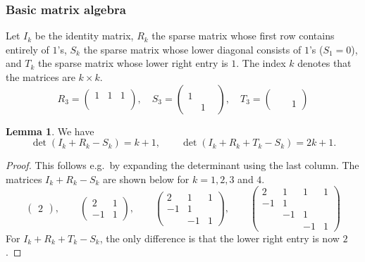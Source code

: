 \documentclass[12pt]{amsart}
\theoremstyle{definition}
\newtheorem{lemma}[theorem]{Lemma}
\numberwithin{equation}{section}
\begin{document}
\subsubsection{Basic matrix algebra}
Let $I_k$ be the identity matrix, $R_{k}$ the sparse matrix whose first row contains entirely of $1$'s, $S_{k}$ the sparse matrix whose lower diagonal consists of $1$'s ($S_1=0$), and $T_k$ the sparse matrix whose lower right entry is $1$. The index $k$ denotes that the matrices are $k\times k$.
\begin{equation}
R_3=\begin{pmatrix}1&1&1\\&&\\&&\end{pmatrix},\quad S_3=\begin{pmatrix}&&\\1&\\&1\end{pmatrix},\quad T_3=\begin{pmatrix}&&\\&&\\&&1\end{pmatrix}
\end{equation}
\begin{lemma}\label{lemma:DeterminantIdentity} We have
\begin{equation}
\det(I_k+R_k-S_k)=k+1,\qquad \det(I_k+R_k+T_k-S_k)=2k+1.
\end{equation}
\end{lemma}
\begin{proof}
This follows e.g.~by expanding the determinant using the last column. The matrices $I_k+R_k-S_k$ are shown below for $k=1,2,3$ and $4$.
\begin{equation}
\begin{pmatrix}2\end{pmatrix},\qquad \begin{pmatrix}2&1\\-1&1\end{pmatrix},\qquad \begin{pmatrix}2&1&1\\-1&1&\\&-1&1\end{pmatrix},\qquad\begin{pmatrix}2&1&1&1\\-1&1&&\\&-1&1&\\&&-1&1\end{pmatrix}
\end{equation}
For $I_k+R_k+T_k-S_k$, the only difference is that the lower right entry is now $2$.
\end{proof}
\end{document}
